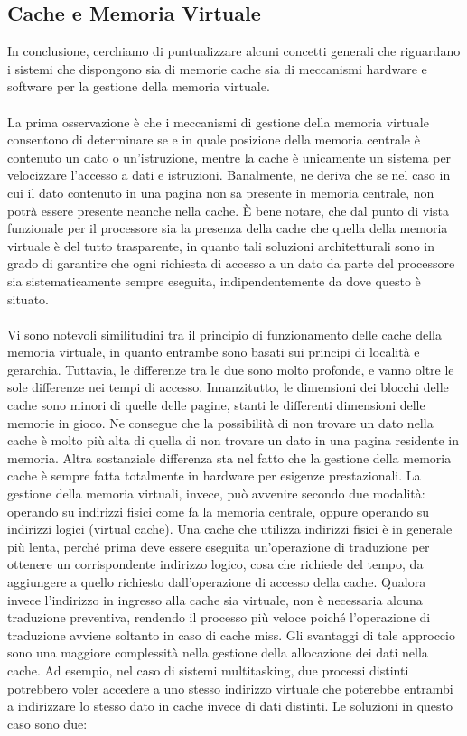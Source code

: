 \subsection{Cache e Memoria Virtuale}
In conclusione, cerchiamo di puntualizzare alcuni concetti generali che riguardano i sistemi che dispongono sia di memorie cache sia di meccanismi hardware e software per la gestione della memoria virtuale.
\\
\\
La prima osservazione è che i meccanismi di gestione della memoria virtuale consentono di determinare se e in quale posizione della memoria centrale è contenuto un dato o un'istruzione, mentre la cache è unicamente un sistema per velocizzare l'accesso a dati e istruzioni. Banalmente, ne deriva che se nel caso in cui il dato contenuto in una pagina non sa presente in memoria centrale, non potrà essere presente neanche nella cache. \MakeUppercase{è} bene notare, che dal punto di vista funzionale per il processore sia la presenza della cache che quella della memoria virtuale è del tutto trasparente, in quanto tali soluzioni architetturali sono in grado di garantire che ogni richiesta di accesso a un dato da parte del processore sia sistematicamente sempre eseguita, indipendentemente da dove questo è situato.
\\
\\
Vi sono notevoli similitudini tra il principio di funzionamento delle cache della memoria virtuale, in quanto entrambe sono basati sui principi di località e gerarchia. Tuttavia, le differenze tra le due sono molto profonde, e vanno oltre le sole differenze nei tempi di accesso. Innanzitutto, le dimensioni dei blocchi delle cache sono minori di quelle delle pagine, stanti le differenti dimensioni delle memorie in gioco. Ne consegue che la possibilità di non trovare un dato nella cache è molto più alta di quella di non trovare un dato in una pagina residente in memoria. Altra sostanziale differenza sta nel fatto che la gestione della memoria cache è sempre fatta totalmente in hardware per esigenze prestazionali. La gestione della memoria virtuali, invece, può avvenire secondo due modalità: operando su indirizzi fisici come fa la memoria centrale, oppure operando su indirizzi logici (virtual cache). Una cache che utilizza indirizzi fisici è in generale più lenta, perché prima deve essere eseguita un'operazione di traduzione per ottenere un corrispondente indirizzo logico, cosa che richiede del tempo, da aggiungere a quello richiesto dall'operazione di accesso della cache. Qualora invece l'indirizzo in ingresso alla cache sia virtuale, non è necessaria alcuna traduzione preventiva, rendendo il processo più veloce poiché l'operazione di traduzione avviene soltanto in caso di cache miss. Gli svantaggi di tale approccio sono una maggiore complessità nella gestione della allocazione dei dati nella cache. Ad esempio, nel caso di sistemi multitasking, due processi distinti potrebbero voler accedere a uno stesso indirizzo virtuale che poterebbe entrambi a indirizzare lo stesso dato in cache invece di dati distinti. Le soluzioni in questo caso sono due:
